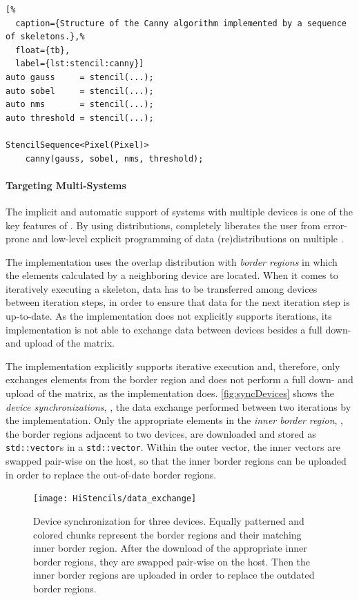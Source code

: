 \begin{lstlisting}[%
  caption={Structure of the Canny algorithm implemented by a sequence of skeletons.},%
  float={tb},
  label={lst:stencil:canny}]
auto gauss     = stencil(...);
auto sobel     = stencil(...);
auto nms       = stencil(...);
auto threshold = stencil(...);

StencilSequence<Pixel(Pixel)>
    canny(gauss, sobel, nms, threshold);
\end{lstlisting}

\paragraph{Targeting Multi-\GPU Systems}
The implicit and automatic support of systems with multiple \OpenCL devices is one of the key features of \SkelCL.
By using distributions, \SkelCL completely liberates the user from error-prone and low-level explicit programming of data (re)distributions on multiple \GPUs.

The  implementation uses the overlap distribution with \textit{border regions} in which the elements calculated by a neighboring device are located.
When it comes to iteratively executing a skeleton, data has to be transferred among devices between iteration steps, in order to ensure that data for the next iteration step is up-to-date.
As the  implementation does not explicitly supports iterations, its implementation is not able to exchange data between devices besides a full down- and upload of the matrix.

The  implementation explicitly supports iterative execution and, therefore, only exchanges elements from the border region and does not perform a full down- and upload of the matrix, as the  implementation does.
\autoref{fig:syncDevices} shows the \textit{device synchronizations}, \ie, the data exchange performed between two iterations by the  implementation.
Only the appropriate elements in the \emph{inner border region}, \ie, the border regions adjacent to two \OpenCL devices, are downloaded and stored as \texttt{std::vector}s in a \texttt{std::vector}.
Within the outer vector, the inner vectors are swapped pair-wise on the host, so that the inner border regions can be uploaded in order to replace the out-of-date border regions.

\begin{figure}[tb]
  \centering
  \texttt{[image: HiStencils/data\_exchange]}
  \caption[Device synchronization for three devices during the execution of the \stencil skeleton.]
          {\small Device synchronization for three devices. Equally patterned and colored chunks represent the border regions and their matching inner border region. After the download of the appropriate inner border regions, they are swapped pair-wise on the host. Then the inner border regions are uploaded in order to replace the outdated border regions.}
  \label{fig:syncDevices}
  \vspace{1em}
\end{figure}


